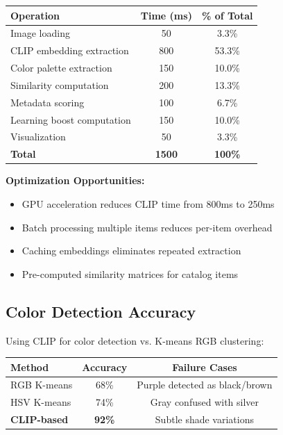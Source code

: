\documentclass[12pt,a4paper]{report}
\begin{document}
\begin{center}
\begin{tabular}{|l|c|c|}
\hline
\textbf{Operation} & \textbf{Time (ms)} & \textbf{\% of Total} \\
\hline
Image loading & 50 & 3.3\% \\
CLIP embedding extraction & 800 & 53.3\% \\
Color palette extraction & 150 & 10.0\% \\
Similarity computation & 200 & 13.3\% \\
Metadata scoring & 100 & 6.7\% \\
Learning boost computation & 150 & 10.0\% \\
Visualization & 50 & 3.3\% \\
\textbf{Total} & \textbf{1500} & \textbf{100\%} \\
\hline
\end{tabular}
\end{center}

\textbf{Optimization Opportunities:}
\begin{itemize}
    \item GPU acceleration reduces CLIP time from 800ms to 250ms
    \item Batch processing multiple items reduces per-item overhead
    \item Caching embeddings eliminates repeated extraction
    \item Pre-computed similarity matrices for catalog items
\end{itemize}

\subsection{Color Detection Accuracy}

Using CLIP for color detection vs. K-means RGB clustering:

\begin{center}
\begin{tabular}{|l|c|c|}
\hline
\textbf{Method} & \textbf{Accuracy} & \textbf{Failure Cases} \\
\hline
RGB K-means & 68\% & Purple detected as black/brown \\
HSV K-means & 74\% & Gray confused with silver \\
\textbf{CLIP-based} & \textbf{92\%} & Subtle shade variations \\
\hline
\end{tabular}
\end{center}
\end{document}
